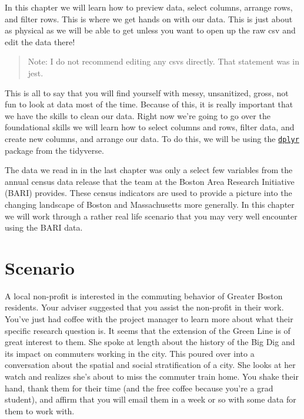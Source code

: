 \documentclass[
]{book}
\begin{document}
In this chapter we will learn how to preview data, select columns, arrange rows, and filter rows. This is where we get hands on with our data. This is just about as physical as we will be able to get unless you want to open up the raw csv and edit the data there!

\begin{quote}
Note: I do not recommend editing any csvs directly. That statement was in jest.
\end{quote}

This is all to say that you will find yourself with messy, unsanitized, gross, not fun to look at data most of the time. Because of this, it is really important that we have the skills to clean our data. Right now we're going to go over the foundational skills we will learn how to select columns and rows, filter data, and create new columns, and arrange our data. To do this, we will be using the \href{https://dplyr.tidyverse.org}{\texttt{dplyr}} package from the tidyverse.

The data we read in in the last chapter was only a select few variables from the annual census data release that the team at the Boston Area Research Initiative (BARI) provides. These census indicators are used to provide a picture into the changing landscape of Boston and Massachusetts more generally. In this chapter we will work through a rather real life scenario that you may very well encounter using the BARI data.

\hypertarget{scenario}{%
\section{Scenario}\label{scenario}}

A local non-profit is interested in the commuting behavior of Greater Boston residents. Your adviser suggested that you assist the non-profit in their work. You've just had coffee with the project manager to learn more about what their specific research question is. It seems that the extension of the Green Line is of great interest to them. She spoke at length about the history of the Big Dig and its impact on commuters working in the city. This poured over into a conversation about the spatial and social stratification of a city. She looks at her watch and realizes she's about to miss the commuter train home. You shake their hand, thank them for their time (and the free coffee because you're a grad student), and affirm that you will email them in a week or so with some data for them to work with.
\end{document}
